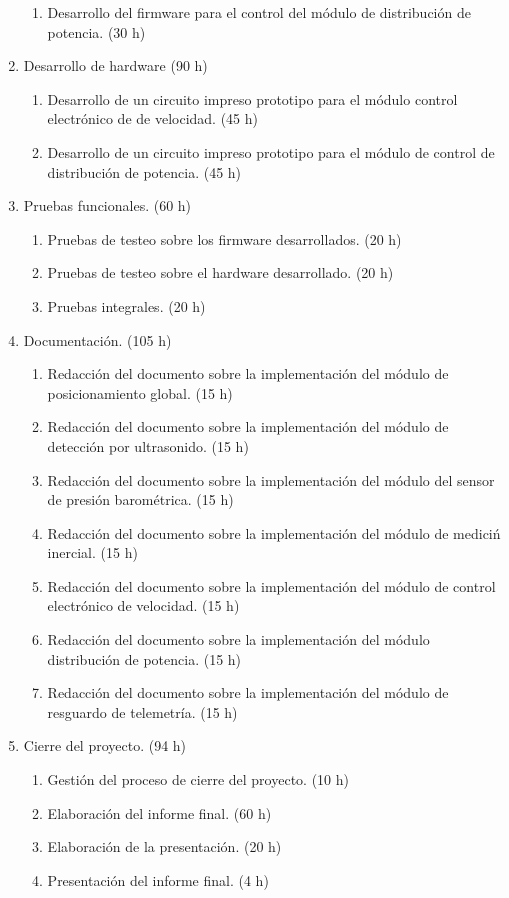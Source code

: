 \documentclass[
11pt, %
]{charter}
\begin{document}
\begin{enumerate}
\begin{enumerate}
			      \item Desarrollo del firmware para el control del m\'odulo de distribuci\'on de potencia. (30 h)
		      \end{enumerate}
		\item Desarrollo de hardware (90 h)
		      \begin{enumerate}
				  \item	Desarrollo de un circuito impreso prototipo para el m\'odulo control electr\'onico de de velocidad. (45 h)
			      \item Desarrollo de un circuito impreso prototipo para el m\'odulo de control de distribuci\'on de potencia. (45 h)
		      \end{enumerate}
		\item Pruebas funcionales. (60 h)
		      \begin{enumerate}
			      \item Pruebas de testeo sobre los firmware desarrollados. (20 h)
			      \item Pruebas de testeo sobre el hardware desarrollado. (20 h)
			      \item Pruebas integrales. (20 h)
		      \end{enumerate}
		\item Documentaci\'on. (105 h)
		      \begin{enumerate}
			      \item Redacci\'on del documento sobre la implementaci\'on del m\'odulo de posicionamiento global. (15 h)
			      \item Redacci\'on del documento sobre la implementaci\'on del m\'odulo de detecci\'on por ultrasonido. (15 h)
			      \item Redacci\'on del documento sobre la implementaci\'on del m\'odulo del sensor de presi\'on barom\'etrica. (15 h)
			      \item Redacci\'on del documento sobre la implementaci\'on del m\'odulo de medici\'n inercial. (15 h)
			      \item Redacci\'on del documento sobre la implementaci\'on del m\'odulo de control electr\'onico de velocidad. (15 h)
			      \item Redacci\'on del documento sobre la implementaci\'on del m\'odulo distribuci\'on de potencia. (15 h)
			      \item Redacci\'on del documento sobre la implementaci\'on del m\'odulo de resguardo de telemetr\'ia. (15 h)
		      \end{enumerate}
		\item Cierre del proyecto. (94 h)
		      \begin{enumerate}
			      \item Gesti\'on del proceso de cierre del proyecto. (10 h)
			      \item Elaboraci\'on del informe final. (60 h)
			      \item Elaboraci\'on de la presentaci\'on. (20 h)
			      \item Presentaci\'on del informe final. (4 h)
		      \end{enumerate}
	\end{enumerate}
\end{document}
